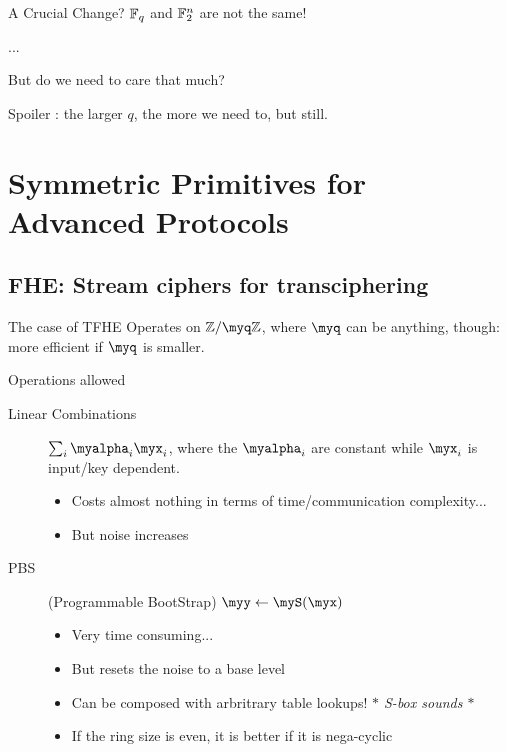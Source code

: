 \documentclass[presentation,aspectratio=1610]{beamer}
\begin{document}
\begin{frame}{A Crucial Change?}
  $\mathbb{F}_q$ and $\mathbb{F}_2^n$ are not the same!

  ...

  But do we need to care that much?


  Spoiler : the larger $q$, the more we need to, but still.
\end{frame}


\section{Symmetric Primitives for Advanced Protocols}

\subsection{FHE: Stream ciphers for transciphering}

\begin{frame}{The case of TFHE}
  Operates on $\Zmod{\myq}$, where $\myq$ can be anything, though:
  more efficient if $\myq$ is smaller.
  
  \begin{exampleblock}{Operations allowed}
    \begin{description}
    \item[Linear Combinations] $\sum_i \myalpha_i \myx_i$, where the $\myalpha_i$ are constant while $\myx_i$ is input/key dependent.

      \begin{itemize}
      \item Costs almost nothing in terms of time/communication complexity...
      \item But \alert{noise} increases
      \end{itemize}
      \pause
    \item[PBS] (\alert{P}rogrammable \alert{B}oot\alert{S}trap) \hspace{0.5cm} $\myy \gets \myS(\myx)$
      \begin{itemize}
      \item Very time consuming...
      \item But resets the noise to a \alert{base level} \pause
      \item Can be composed with \alert{arbritrary table lookups!} \pause \hfill {\emph{\color{gray}$*$ S-box sounds $*$}}
      \item If the ring size is even, it is better if it is \alert{nega-cyclic}
      \end{itemize}
    \end{description}
  \end{exampleblock}
\end{frame}
\end{document}
